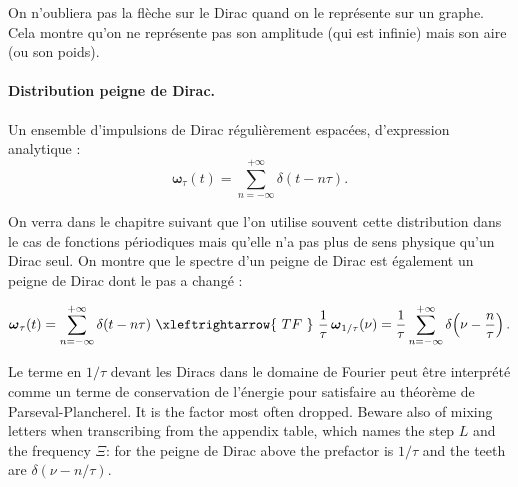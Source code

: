 \begin{remark}
  On n'oubliera pas la flèche sur le Dirac quand on le représente sur un
  graphe. Cela montre qu'on ne représente pas son amplitude (qui est infinie)
  mais son aire (ou son poids).
\end{remark}

\paragraph{Distribution peigne de Dirac.}

\begin{definition}
  Un ensemble d'impulsions de Dirac régulièrement espacées, d'expression
  analytique :
  \[
    \boldsymbol{\omega}_\tau(t)=\sum_{n=-\infty}^{+\infty}\delta(t-n\tau).
  \]
\end{definition}

On verra dans le chapitre suivant que l'on utilise souvent cette distribution
dans le cas de fonctions périodiques mais qu'elle n'a pas plus de sens physique
qu'un Dirac seul. On montre que le spectre d'un peigne de Dirac est également un
peigne de Dirac dont le pas a changé :

\[
  \boldsymbol{\omega}_\tau(t)=\sum_{n=-\infty}^{+\infty}\delta(t-n\tau)
  \ \xleftrightarrow{\ TF\ }\
  \frac{1}{\tau}\,\boldsymbol{\omega}_{1/\tau}(\nu)
  =\frac{1}{\tau}\sum_{n=-\infty}^{+\infty}\delta\!\left(\nu-\frac{n}{\tau}\right).
\]

\begin{remark}
  Le terme en $1/\tau$ devant les Diracs dans le domaine de Fourier peut être
  interprété comme un terme de conservation de l'énergie pour satisfaire au
  théorème de Parseval-Plancherel. It is the factor most often dropped. Beware
  also of mixing letters when transcribing from the appendix table, which names
  the step $L$ and the frequency $\Xi$: for the peigne de Dirac above the
  prefactor is $1/\tau$ and the teeth are $\delta(\nu-n/\tau)$.
\end{remark}

